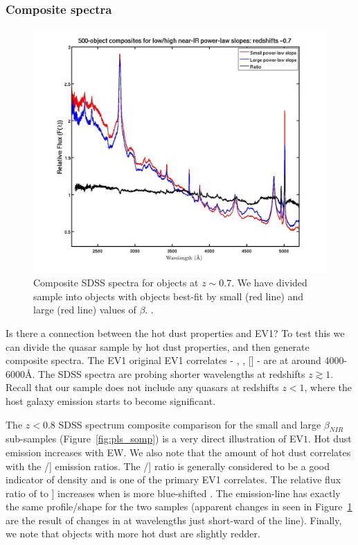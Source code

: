 \subsubsection{Composite spectra}

\begin{figure}
  \centering
  \includegraphics[width=\textwidth]{figures/chapter05/z07_pls_comps.jpg}
  \caption[{Composite SDSS spectra for objects at $z\sim0.7$.}]{Composite SDSS spectra for objects at $z\sim0.7$. We have divided sample into objects with objects best-fit by small (red line) and large (red line) values of $\beta$. .}
  \label{fig:pls_comp}
\end{figure}

Is there a connection between the hot dust properties and EV1? 
To test this we can divide the quasar sample by hot dust properties, and then generate composite spectra. 
The EV1 original EV1 correlates - , \hb, [] - are at around 4000-6000\AA. 
The SDSS spectra are probing shorter wavelengths at redshifts $z\gtrsim1$.
Recall that our sample does not include any quasars at redshifts $z<1$, where the host galaxy emission starts to become significant. 

The $z < 0.8$ SDSS spectrum composite comparison for the small and large $\beta_{NIR}$ sub-samples (Figure~\ref{fig:pls_somp}) is a very direct illustration of EV$1$. 
Hot dust emission increases with  EW. 
We also note that the amount of hot dust correlates with the /] emission ratios. 
The /] ratio is generally considered to be a good indicator of density and is one of the primary EV1 correlates. 
The relative flux ratio of  to ] increases when  is more blue-shifted \citep{richards11}. 
The  emission-line has exactly the same profile/shape for the two samples (apparent changes in  seen in Figure~\ref{fig:pls_comp} are the result of changes in  at wavelengths just short-ward of the line). 
Finally, we note that objects with more hot dust are slightly redder.

